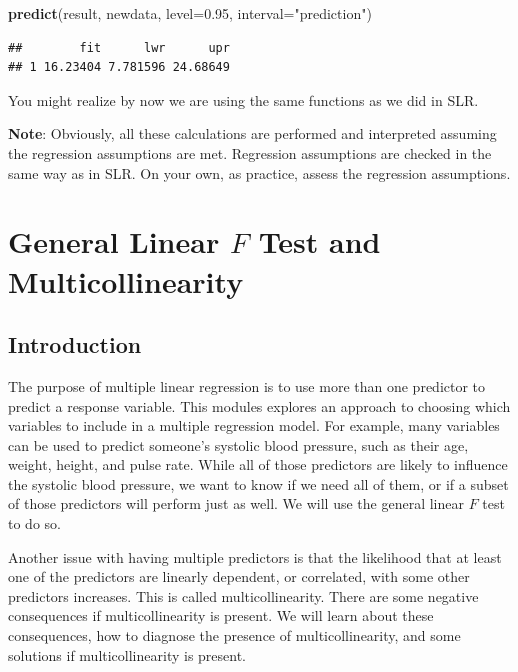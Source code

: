 \documentclass[
]{book}
\newenvironment{Shaded}{\begin{snugshade}}{\end{snugshade}}
\newcommand{\AttributeTok}[1]{\textcolor[rgb]{0.13,0.29,0.53}{#1}}
\newcommand{\FloatTok}[1]{\textcolor[rgb]{0.00,0.00,0.81}{#1}}
\newcommand{\FunctionTok}[1]{\textcolor[rgb]{0.13,0.29,0.53}{\textbf{#1}}}
\newcommand{\NormalTok}[1]{#1}
\newcommand{\StringTok}[1]{\textcolor[rgb]{0.31,0.60,0.02}{#1}}
\begin{document}
\begin{Shaded}
\begin{Highlighting}[]
\FunctionTok{predict}\NormalTok{(result, newdata, }\AttributeTok{level=}\FloatTok{0.95}\NormalTok{,}
        \AttributeTok{interval=}\StringTok{"prediction"}\NormalTok{)}
\end{Highlighting}
\end{Shaded}

\begin{verbatim}
##        fit      lwr      upr
## 1 16.23404 7.781596 24.68649
\end{verbatim}

You might realize by now we are using the same functions as we did in SLR.

\textbf{Note}: Obviously, all these calculations are performed and interpreted assuming the regression assumptions are met. Regression assumptions are checked in the same way as in SLR. On your own, as practice, assess the regression assumptions.

\hypertarget{genF}{%
\chapter{\texorpdfstring{General Linear \(F\) Test and Multicollinearity}{General Linear F Test and Multicollinearity}}\label{genF}}

\hypertarget{introduction-6}{%
\section{Introduction}\label{introduction-6}}

The purpose of multiple linear regression is to use more than one predictor to predict a response variable. This modules explores an approach to choosing which variables to include in a multiple regression model. For example, many variables can be used to predict someone's systolic blood pressure, such as their age, weight, height, and pulse rate. While all of those predictors are likely to influence the systolic blood pressure, we want to know if we need all of them, or if a subset of those predictors will perform just as well. We will use the general linear \(F\) test to do so.

Another issue with having multiple predictors is that the likelihood that at least one of the predictors are linearly dependent, or correlated, with some other predictors increases. This is called multicollinearity. There are some negative consequences if multicollinearity is present. We will learn about these consequences, how to diagnose the presence of multicollinearity, and some solutions if multicollinearity is present.
\end{document}
